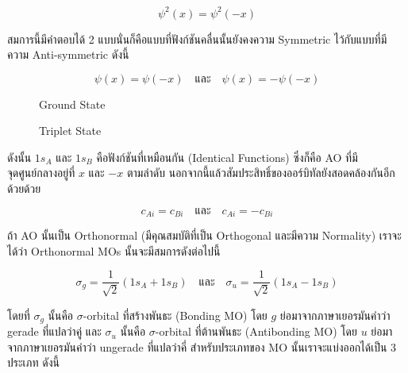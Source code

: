 \begin{equation}
    \psi^2(x) = \psi^2(-x)
\end{equation}

\noindent สมการนี้มีคำตอบได้ 2 แบบนั่นก็คือแบบที่ฟังก์ชันคลื่นนั้นยังคงความ Symmetric ไว้กับแบบที่มีความ Anti-symmetric ดังนี้

\begin{equation}
    \psi(x) = \psi(-x) 
    \quad \text{และ} \quad 
    \psi(x) = -\psi(-x)
\end{equation}

\begin{figure}[htbp]
    \label{fig:MO_H2_ground}
    \centering
    \begin{MOdiagram}[names,style=square]
    \end{MOdiagram}
    \caption{Ground State}
\end{figure}

\begin{figure}[htbp]
    \label{fig:MO_H2_triplet}
    \centering
    \begin{MOdiagram}[names,style=square]
    \end{MOdiagram}
    \caption{Triplet State}
\end{figure}

\noindent ดังนั้น $1 s_A$ และ $1 s_B$ คือฟังก์ชันที่เหมือนกัน (Identical Functions) ซึ่งก็คือ AO ที่มีจุดศูนย์กลางอยู่ที่ $x$ และ 
$-x$ ตามลำดับ นอกจากนี้แล้วสัมประสิทธิ์ของออร์บิทัลยังสอดคล้องกันอีกด้วยด้วย 

\begin{equation}
    c_{A i} = c_{B i}
    \quad \text{และ} \quad
    c_{A i} = -c_{B i}
\end{equation}

ถ้า AO นั้นเป็น Orthonormal (มีคุณสมบัติที่เป็น Orthogonal และมีความ Normality) เราจะได้ว่า Orthonormal MOs นั้นจะมีสมการดังต่อไปนี้ 

\begin{equation}
    \sigma_g 
    = 
    \frac{1}{\sqrt{2}}\left(1 s_A+1 s_B\right) 
    \quad \text{และ} \quad 
    \sigma_u 
    = 
    \frac{1}{\sqrt{2}}\left(1 s_A-1 s_B\right)
\end{equation}

\noindent โดยที่ $\sigma_g$ นั้นคือ $\sigma$-orbital ที่สร้างพันธะ (Bonding MO) โดย $g$ ย่อมาจากภาษาเยอรมันคำว่า gerade 
ที่แปลว่าคู่ และ $\sigma_u$ นั้นคือ $\sigma$-orbital ที่ต้านพันธะ (Antibonding MO) โดย $u$ ย่อมาจากภาษาเยอรมันคำว่า ungerade
ที่แปลว่าคี่ สำหรับประเภทของ MO นั้นเราจะแบ่งออกได้เป็น 3 ประเภท ดังนี้

